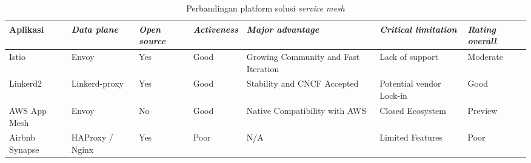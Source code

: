 \begin{longtable}{|p{1.5cm}|p{1.5cm}|p{1.5cm}|p{1.5cm}|p{1.5cm}|p{1.5cm}|p{1.5cm}|}
  \caption{Perbandingan platform solusi \textit{service mesh} \parencite{li2019}} \label{tab:perbandingan-service-mesh}                                                                                                                                \\
  \hline
  \rowcolor{gray!30} \textbf{Aplikasi} & \textbf{\textit{Data plane}} & \textbf{\textit{Open source}} & \textbf{\textit{Activeness}} & \textbf{\textit{Major advantage}}    & \textbf{\textit{Critical limitation}} & \textbf{\textit{Rating overall}} \\
  \hline
  \endfirsthead

  \endhead

  Istio                                & Envoy                        & Yes                           & Good                         & Growing Community and Fast Iteration & Lack of support                       & Moderate \tabularnewline \hline

  Linkerd2                             & Linkerd-proxy                & Yes                           & Good                         & Stability and CNCF Accepted          & Potential vendor Lock-in              & Good \tabularnewline \hline

  AWS App Mesh                         & Envoy                        & No                            & Good                         & Native Compatibility with AWS        & Closed Ecosystem                      & Preview \tabularnewline \hline

  Airbnb Synapse                       & HAProxy / Nginx              & Yes                           & Poor                         & N/A                                  & Limited Features                      & Poor \tabularnewline \hline

  \hline
\end{longtable}
